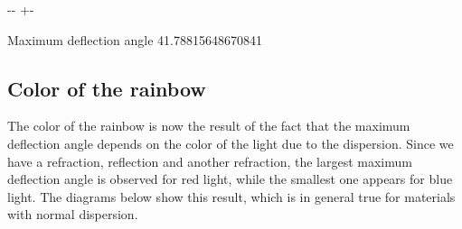 \documentclass[letterpaper,10pt,english]{sphinxmanual}
\newlength\nbsphinxcodecellspacing
\begin{document}
{

\kern-\sphinxverbatimsmallskipamount\kern-\baselineskip
\kern+\FrameHeightAdjust\kern-\fboxrule
\vspace{\nbsphinxcodecellspacing}

\begin{sphinxVerbatim}[commandchars=\\\{\}]
Maximum deflection angle  41.78815648670841
\end{sphinxVerbatim}
}


\subsection{Color of the rainbow}
\label{\detokenize{notebooks/L4/Rainbow:Color-of-the-rainbow}}
The color of the rainbow is now the result of the fact that the maximum deflection angle depends on the color of the light due to the dispersion. Since we have a refraction, reflection and another refraction, the largest maximum deflection angle is observed for red light, while the smallest one appears for blue light. The diagrams below show this result, which is in general true for materials with normal dispersion.
\end{document}
